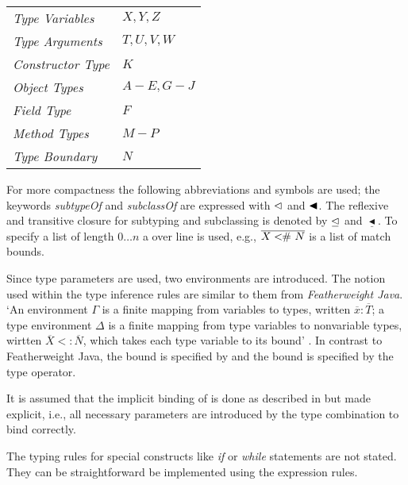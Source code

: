 \begin{table}[H]
	\begin{tabular}{ll}
		\textit{Type Variables} & $X, Y, Z$ \\
		\textit{Type Arguments} & $T, U, V, W$ \\
		\textit{Constructor Type} & $K$ \\
		\textit{Object Types} & $A - E, G - J$ \\
		\textit{Field Type} & $F$ \\
		\textit{Method Types} & $M - P$ \\
		\textit{Type Boundary} & $N$
	\end{tabular}
\end{table}

For more compactness the following abbreviations and symbols are used; the
keywords \emph{subtypeOf} and \emph{subclassOf} are expressed with $\vartriangleleft$
and $\blacktriangleleft$. The reflexive and transitive closure for subtyping and
subclassing is denoted by $\trianglelefteq$ and $\underline{\blacktriangleleft}$.
To specify a list of length $0\ldots n$ a over line is used, e.g.,
$\overline{X <\!\!\#~ N}$ is a list of match bounds.

Since type parameters are used, two environments are introduced. The
notion used within the type inference rules are similar to them from
\emph{Featherweight Java}. `An environment $\Gamma$ is a finite
mapping from variables to types, written $\overline{x}:\overline{T}$;
a type environment $\Delta$ is a finite mapping from type variables to
nonvariable types, wirtten $\overline{X}<:\overline{N}$, which takes each
type variable to its bound' \cite{igarashi_featherweight_1999}. In contrast
to Featherweight Java, the bound is specified by \match and the bound is
specified by the type operator.

It is assumed that the implicit binding of \mytype is done as described
in  but made explicit, i.e., all necessary
parameters are introduced by the type combination to bind \mytype
correctly.

The typing rules for special constructs like \emph{if} or \emph{while}
statements are not stated. They can be straightforward be implemented
using the expression rules.

